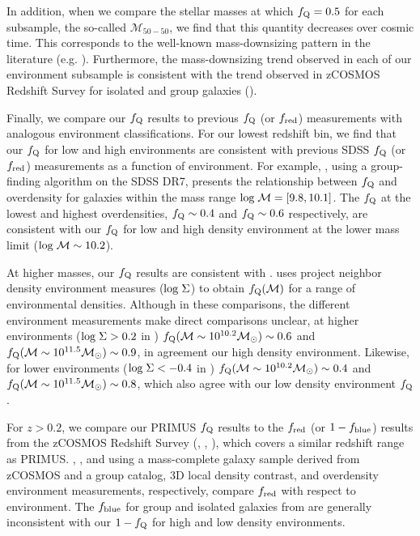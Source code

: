 \documentclass{emulateapj}
\begin{document}
In addition, when we compare the stellar masses at which $f_{\rm{Q}} = 0.5$ for each subsample, the so-called $\mathcal{M}_{50-50}$, we find that this quantity decreases over cosmic time. This corresponds to the well-known mass-downsizing pattern in the literature (e.g. \cite{bundy06a}). Furthermore, the mass-downsizing trend observed in each of our environment subsample is consistent with the trend observed in zCOSMOS Redshift Survey for isolated and group galaxies (\cite{Iovino:2010aa}). %

Finally, we compare our $f_{\rm{Q}}$ results to previous $f_{\rm{Q}}$ (or $f_{\rm{red}}$) measurements with analogous environment classifications. For our lowest redshift bin, we find that our $f_{\rm{Q}}$ for low and high environments are consistent with previous SDSS $f_{\rm{Q}}$ (or $f_{\rm{red}}$) measurements as a function of environment. For example, \cite{Tinker:2011aa}, using a group-finding algorithm on the SDSS DR7, presents the relationship between $f_{\rm{Q}}$ and overdensity for galaxies within the mass range $\rm{log} \; \mathcal{M} = [9.8, 10.1]$. The \cite{Tinker:2011aa} $f_{\rm{Q}}$ at the lowest and highest overdensities, $f_{\rm{Q}} \sim 0.4$ and $f_{\rm{Q}} \sim 0.6$ respectively, are consistent with our $f_{\rm{Q}}$ for low and high density environment at the lower mass limit ($\rm{log} \; \mathcal{M} \sim 10.2$). 

At higher masses, our $f_{\rm{Q}}$ results are consistent with \cite{Baldry:2006aa}. \cite{Baldry:2006aa} uses project neighbor density environment measures ($\rm{log} \;  \Sigma$) to obtain $f_{\rm{Q}}(\mathcal{M})$ for a range of environmental densities. Although in these comparisons, the different environment measurements make direct comparisons unclear, at higher environments ($\rm{log} \; \Sigma > 0.2$ in \cite{Baldry:2006aa}) $f_{\rm{Q}}(\mathcal{M} \sim 10^{10.2} \mathcal{M}_{\odot}) \sim 0.6$ and $f_{\rm{Q}}(\mathcal{M} \sim 10^{11.5} \mathcal{M}_{\odot}) \sim 0.9$, in agreement our high density environment. Likewise, for lower environments ($\rm{log} \; \Sigma < -0.4$ in \cite{Baldry:2006aa}) $f_{\rm{Q}}(\mathcal{M} \sim 10^{10.2} \mathcal{M}_{\odot}) \sim 0.4$ and $f_{\rm{Q}}(\mathcal{M} \sim 10^{11.5} \mathcal{M}_{\odot}) \sim 0.8$, which also agree with our low density environment $f_{\rm{Q}}$. 

For $z > 0.2$, we compare our PRIMUS $f_{\rm{Q}}$ results to the $f_{\rm{red}}$ (or $1-f_{\rm{blue}}$) results from the zCOSMOS Redshift Survey (\cite{Iovino:2010aa}, \cite{Cucciati:2010aa}, \cite{Kovac:2014aa}), which covers a similar redshift range as PRIMUS. \cite{Iovino:2010aa}, \cite{Cucciati:2010aa}, and \cite{Kovac:2014aa} using a mass-complete galaxy sample derived from zCOSMOS and a group catalog, 3D local density contrast, and overdensity environment measurements, respectively, compare $f_{\rm{red}}$ with respect to environment. The $f_{\rm{blue}}$ for group and isolated galaxies from \cite{Iovino:2010aa} are generally inconsistent with our $1-f_{\rm{Q}}$ for high and low density environments. 
\end{document}
